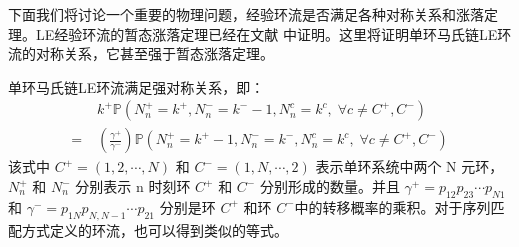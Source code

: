 
下面我们将讨论一个重要的物理问题，经验环流是否满足各种对称关系和涨落定理。LE经验环流的暂态涨落定理已经在文献 \cite{andrieux2007network} 中证明。这里将证明单环马氏链LE环流的对称关系，它甚至强于暂态涨落定理。

\begin{proposition} \label{strong_symmetric}
    单环马氏链LE环流满足强对称关系，即：
    \begin{align} 
        &\;k^+ \mathbb{P}\left(N^+_n=k^+,N^-_n=k^- -1,N^c_n=k^c,\;\forall c\neq C^+,C^-\right)\\
        =&\; \left(\frac{\gamma^+}{\gamma^-}\right)\mathbb{P}\left(N^+_n=k^+ -1,N^-_n=k^-,N^c_n=k^c,\;\forall c\neq C^+,C^-\right)
    \end{align}
    该式中 $C^+ = (1,2,\cdots,N)$ 和 $C^- = (1,N,\cdots,2)$ 表示单环系统中两个 N 元环，$N^+_n$ 和 $N^-_n$ 分别表示 n 时刻环  $C^+$ 和 $C^-$ 分别形成的数量。并且 $\gamma^+ = p_{12}p_{23}\cdots p_{N1}$ 和 $\gamma^- = p_{1N}p_{N,N-1}\cdots p_{21}$ 分别是环 $C^+$ 和环 $C^-$中的转移概率的乘积。对于序列匹配方式定义的环流，也可以得到类似的等式\cite{pietzonka2021cycle}。
\end{proposition}
